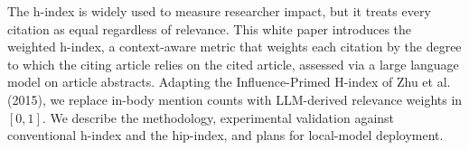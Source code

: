 The h-index is widely used to measure researcher impact, but it treats every citation as equal regardless of relevance. This white paper introduces the weighted h-index, a context-aware metric that weights each citation by the degree to which the citing article relies on the cited article, assessed via a large language model on article abstracts. Adapting the Influence-Primed H-index of Zhu et al. (2015), we replace in-body mention counts with LLM-derived relevance weights in $[0,1]$. We describe the methodology, experimental validation against conventional h-index and the hip-index, and plans for local-model deployment.
